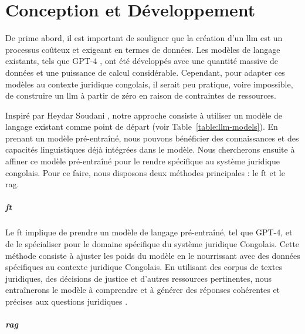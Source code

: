 
\chapter{Conception et Développement} %

\label{ch:2} %

De prime abord, il est important de souligner que la création d'un \ac{llm} est un processus coûteux et exigeant en termes de données. Les modèles de langage existants, tels que GPT-4 \cite{openai2023gpt4}, ont été développés avec une quantité massive de données et une puissance de calcul considérable. Cependant, pour adapter ces modèles au contexte juridique congolais, il serait peu pratique, voire impossible, de construire un \ac{llm} à partir de zéro en raison de contraintes de ressources.

Inspiré par Heydar Soudani \cite{soudani2024fine}, notre approche consiste à utiliser un modèle de langage existant comme point de départ (voir Table~\ref{table:llm-models}). En prenant un modèle pré-entraîné, nous pouvons bénéficier des connaissances et des capacités linguistiques déjà intégrées dans le modèle. Nous chercherons ensuite à affiner ce modèle pré-entraîné pour le rendre spécifique au système juridique congolais. Pour ce faire, nous disposons deux méthodes principales : le \ac{ft} et le \ac{rag}.

\paragraph{\acf{ft}} \hspace{0pt}

Le \ac{ft} implique de prendre un modèle de langage pré-entraîné, tel que GPT-4, et de le spécialiser pour le domaine spécifique du système juridique Congolais. Cette méthode consiste à ajuster les poids du modèle en le nourrissant avec des données spécifiques au contexte juridique Congolais. En utilisant des corpus de textes juridiques, des décisions de justice et d'autres ressources pertinentes, nous entraînerons le modèle à comprendre et à générer des réponses cohérentes et précises aux questions juridiques \cite{yue2023disclawllm}.

\paragraph{\acf{rag}} \hspace{0pt}

